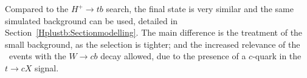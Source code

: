 Compared to the $H^+\to tb$ search, the final state is very similar and the same simulated background can be used, detailed in Section~\ref{Hplustb:Sectionmodelling}. The main difference is the treatment of the small background, as the selection is tighter; and the increased relevance of the \ttbar\ events with the $W\to cb$ decay allowed, due to the presence of a $c$-quark in the $t\to cX$ signal.


